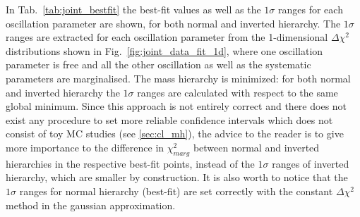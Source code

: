 
In Tab.~\ref{tab:joint_bestfit} the best-fit values as well as the $1\sigma$ ranges for each 
oscillation parameter are shown, for both normal and inverted hierarchy.
The $1\sigma$ ranges are extracted for each oscillation parameter
from the 1-dimensional $\Delta \chi^2$ distributions shown in Fig.~\ref{fig:joint_data_fit_1d},
where one oscillation parameter is free and all the other oscillation as well as the systematic 
parameters are marginalised.
The mass hierarchy is minimized:
for both normal and inverted hierarchy the $1\sigma$ ranges are calculated with respect to the 
same global minimum.
Since this approach is not entirely correct and there does not exist any procedure 
to set more reliable confidence intervals which does not consist of toy MC studies (see \cref{sec:cl_mh}),
the advice to the reader is to give more importance to the difference in $\chi^2_{marg}$
between normal and inverted hierarchies in the respective best-fit points, 
instead of the $1\sigma$ ranges of inverted hierarchy, 
which are smaller by construction.
It is also worth to notice that the $1\sigma$ ranges for normal hierarchy (best-fit)
are set correctly with the constant $\Delta \chi^2$ method in the gaussian approximation.


